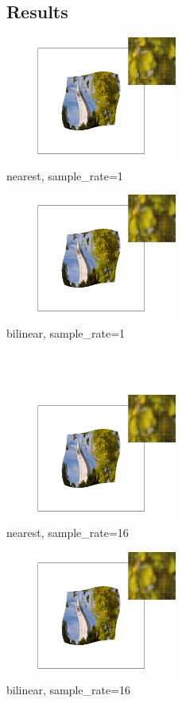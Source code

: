 \documentclass[11pt]{article}
\begin{document}
\subsection{Results}
{
    \centering
    \begin{minipage}[htbp]{160pt}
        \centering\includegraphics[width=160pt]{screenshot_2-17_21-59-6.png}\\nearest, sample\_rate=1
    \end{minipage}
    \begin{minipage}[htbp]{160pt}
        \centering\includegraphics[width=160pt]{screenshot_2-17_21-59-26.png}\\bilinear, sample\_rate=1
    \end{minipage}
}\\\vspace{3pt}\\
{
    \centering
    \begin{minipage}[htbp]{160pt}
        \centering\includegraphics[width=160pt]{screenshot_2-17_21-59-16.png}\\nearest, sample\_rate=16
    \end{minipage}
    \begin{minipage}[htbp]{160pt}
        \centering\includegraphics[width=160pt]{screenshot_2-17_21-59-32.png}\\bilinear, sample\_rate=16
    \end{minipage}
}\\\vspace{3pt}\\
\end{document}
